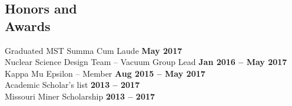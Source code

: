 \documentclass[margin,line]{resume}
\begin{document}
\begin{resume}
    \section{\mysidestyle Honors and\\Awards}
    Graduated MST Summa Cum Laude \hfill \textbf{May 2017}\\
    Nuclear Science Design Team – Vacuum Group Lead \hfill \textbf{Jan 2016 -- May 2017}\\
    Kappa Mu Epsilon – Member \hfill \textbf{Aug 2015 -- May 2017}\\
    Academic Scholar’s list \hfill \textbf{2013 -- 2017}\\
    Missouri Miner Scholarship \hfill \textbf{2013 -- 2017}\\


\end{resume}
\end{document}
